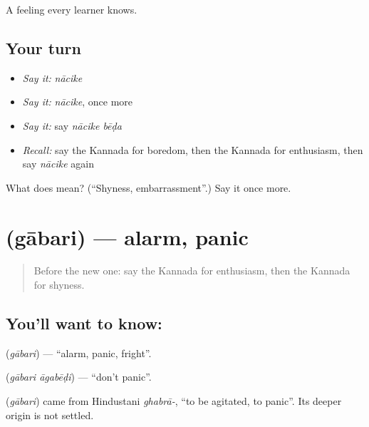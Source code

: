\begin{grammarlens}[title={What you've built}]
A feeling every learner knows.
\end{grammarlens}

\subsection*{Your turn}
\begin{itemize}
\raggedright
  \item \emph{Say it:} \emph{nācike}
  \item \emph{Say it:} \emph{nācike}, once more
  \item \emph{Say it:} say \emph{nācike bēḍa}
  \item \emph{Recall:} say the Kannada for boredom, then the Kannada for enthusiasm, then say \emph{nācike} again
\end{itemize}

\begin{tcolorbox}[breakable,colback=teal!4,colframe=teal!35!black,title={Before you move on}]
What does  mean? (\textquotedblleft{}Shyness, embarrassment\textquotedblright{}.) Say it once more.
\end{tcolorbox}
\section[\texorpdfstring{\kn{ಗಾಬರಿ} (gābari)}{ಗಾಬರಿ (gābari)}]{ (gābari) — alarm, panic}

\label{lesson:KA-C98-alarm}



\begin{quote}
Before the new one: say the Kannada for enthusiasm, then the Kannada for shyness.
\end{quote}

\subsection*{You'll want to know: }
\textbf{} (\emph{gābari}) — \textquotedblleft{}alarm, panic, fright\textquotedblright{}.

\textbf{ } (\emph{gābari āgabēḍi}) — \textquotedblleft{}don't panic\textquotedblright{}.

\begin{cousinweb}
\textbf{} (\emph{gābari}) came from Hindustani \emph{ghabrā-}, \textquotedblleft{}to be agitated, to panic\textquotedblright{}. Its deeper origin is not settled.
\end{cousinweb}

